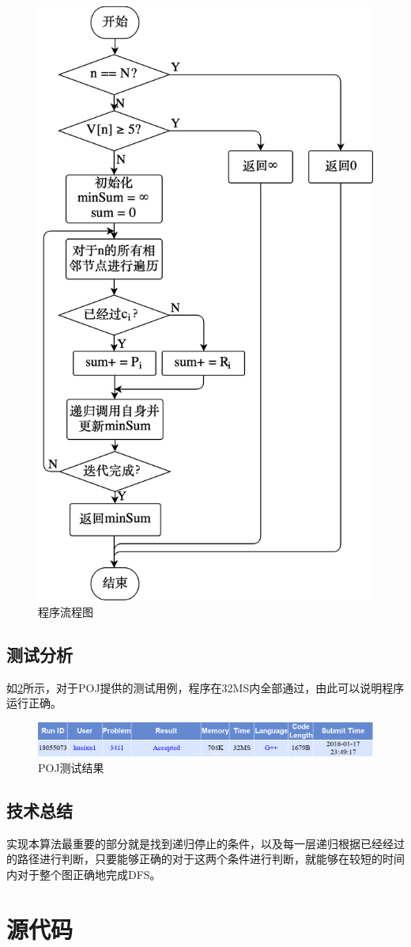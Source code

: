\documentclass{report}
\begin{document}
\begin{figure}[ht]
    \centering
    \includegraphics[width=0.4\linewidth]{flowchart8.png}
    \caption{程序流程图}
    \label{fig:flowchart8}
\end{figure}

\section{测试分析}
\label{sec:ce_shi_fen_xi_8}
如\ref{fig:result8}所示，对于POJ提供的测试用例，程序在32MS内全部通过，由此可以说明程序运行正确。

\begin{figure}[ht]
    \centering
    \includegraphics[width=0.9\linewidth]{result8.png}
    \caption{POJ测试结果}
    \label{fig:result8}
\end{figure}

\section{技术总结}
\label{sec:ji_zhu_zong_jie_8}
实现本算法最重要的部分就是找到递归停止的条件，以及每一层递归根据已经经过的路径进行判断，只要能够正确的对于这两个条件进行判断，就能够在较短的时间内对于整个图正确地完成DFS。


\appendix
\chapter{源代码}
\label{cha:yuan_dai_ma_}
\end{document}
